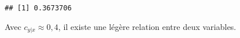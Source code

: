 \documentclass[
  12pt,
]{article}
\newenvironment{Shaded}{\begin{snugshade}}{\end{snugshade}}
\newcommand{\FunctionTok}[1]{\textcolor[rgb]{0.00,0.00,0.00}{#1}}
\newcommand{\NormalTok}[1]{#1}
\newcommand{\SpecialCharTok}[1]{\textcolor[rgb]{0.00,0.00,0.00}{#1}}
\begin{document}
\begin{Shaded}
\end{Shaded}

\begin{verbatim}
## [1] 0.3673706
\end{verbatim}

Avec \(c_{y|x} \approx 0,4\), il existe une légère relation entre deux
variables.
\end{document}
